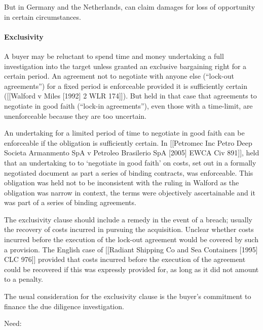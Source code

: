 \documentclass[
]{article}
\newenvironment{Shaded}{}{}
\newcommand{\NormalTok}[1]{#1}
\begin{document}
But in Germany and the Netherlands, can claim damages for loss of
opportunity in certain circumstances.

\hypertarget{exclusivity}{%
\paragraph{Exclusivity}\label{exclusivity}}

A buyer may be reluctant to spend time and money undertaking a full
investigation into the target unless granted an exclusive bargaining
right for a certain period. An agreement not to negotiate with anyone
else (``lock-out agreements'') for a fixed period is enforceable
provided it is sufficiently certain ({[}{[}Walford v Miles {[}1992{]} 2
WLR 174{]}{]}). But held in that case that agreements to negotiate in
good faith (``lock-in agreements''), even those with a time-limit, are
unenforceable because they are too uncertain.

\begin{Shaded}
\begin{Highlighting}[]
\NormalTok{An undertaking for a limited period of time to negotiate in good faith can be enforceable if the obligation is sufficiently certain. In [[Petromec Inc Petro Deep Societa Armanmento SpA v Petroleo Brasilerio SpA [2005] EWCA Civ 891]], held that an undertaking to to ‘negotiate in good faith’ on costs, set out in a formally negotiated document as part a series of binding contracts, was enforceable. This obligation was held not to be inconsistent with the ruling in Walford as the obligation was narrow in context, the terms were objectively ascertainable and it was part of a series of binding agreements.}
\end{Highlighting}
\end{Shaded}

The exclusivity clause should include a remedy in the event of a breach;
usually the recovery of costs incurred in pursuing the acquisition.
Unclear whether costs incurred before the execution of the lock-out
agreement would be covered by such a provision. The English case of
{[}{[}Radiant Shipping Co and Sea Containers {[}1995{]} CLC 976{]}{]}
provided that costs incurred before the execution of the agreement could
be recovered if this was expressly provided for, as long as it did not
amount to a penalty.

The usual consideration for the exclusivity clause is the buyer's
commitment to finance the due diligence investigation.

Need:
\end{document}
